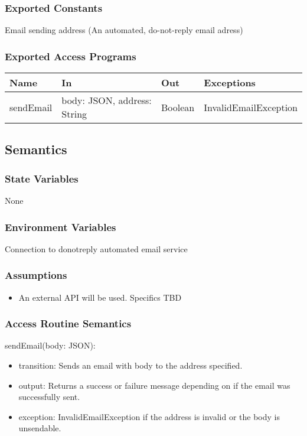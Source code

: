 \documentclass[12pt, titlepage]{article}
\begin{document}
\subsubsection{Exported Constants}
Email sending address (An automated, do-not-reply email adress)
\subsubsection{Exported Access Programs}

\begin{center}
\begin{tabular}{p{2cm} p{4cm} p{2cm} p{4cm}}
\hline
\textbf{Name} & \textbf{In} & \textbf{Out} & \textbf{Exceptions} \\
\hline
sendEmail & body: JSON, address: String & Boolean & InvalidEmailException \\
\hline
\end{tabular}
\end{center}

\subsection{Semantics}

\subsubsection{State Variables}
None

\subsubsection{Environment Variables}
Connection to donotreply automated email service

\subsubsection{Assumptions}
\begin{itemize}
  \item An external API will be used. Specifics TBD
\end{itemize}

\subsubsection{Access Routine Semantics}

\noindent sendEmail(body: JSON):
\begin{itemize}
  \item transition: Sends an email with body to the address specified.
  \item output: Returns a success or failure message depending on if the email was successfully sent.
  \item exception: InvalidEmailException if the address is invalid or the body is unsendable.
\end{itemize}
\end{document}

